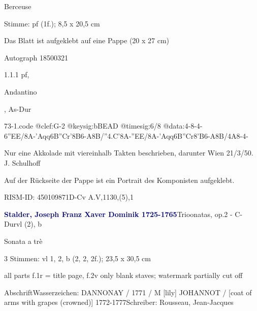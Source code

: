 \documentclass[a4paper, twocolumn, 11pt]{book}
\begin{document}
\par \begin{itshape} Berceuse\end{itshape} 
\par \textcolor{darkblue}{}  Stimme: pf  (1f.); 8,5 x 20,5 cm\newline \begin{small} Das Blatt ist aufgeklebt auf eine Pappe (20 x 27 cm)\end{small} \newline Autograph  18500321
\par 1.1.1  pf, \begin{itshape}Andantino\end{itshape}, As-Dur  
\begin{filecontents*}{73-1.code}
@clef:G-2
@keysig:bBEAD
@timesig:6/8
@data:4-8-4-6''{EE}/8A-'Aqq{6B''C}r{'8B6-A8B}/''4.C'8A-''{EE}/8A-'Aqq{6B''C}r{8'B6-A8B}/4A8-4-
\end{filecontents*}
\newline %
\par Nur eine Akkolade mit viereinhalb Takten beschrieben, darunter {\textquotedbl}Wien 21/3/50. J. Schulhoff{\textquotedbl}
\par Auf der Rückseite der Pappe ist ein Portrait des Komponisten aufgeklebt.
\par RISM-ID: 450109871\newline D-Cv  A.V,1130,(5),1
\par \vspace{16pt} \textcolor{darkblue}{\textbf{Stalder, Joseph Franz Xaver Dominik  1725-1765}}\hfillplus{[74]}\newline Trioonatas, op.2 - C-Dur\newline vl (2), b
\par \begin{itshape} Sonata a trè\end{itshape} 
\par \textcolor{darkblue}{}  3 Stimmen: vl 1, 2, b  (2, 2, 2f.); 23,5 x 30,5 cm\newline \begin{small} all parts f.1r = title page, f.2v only blank staves; watermark partially cut off\end{small} \newline Abschrift\newline Wasserzeichen: DANNONAY / 1771 / M [lily] JOHANNOT / [coat of arms with grapes (crowned)]  1772-1777\newline Schreiber: Rousseau, Jean-Jacques
\end{document}
